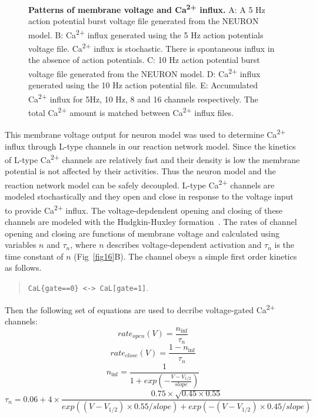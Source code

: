 \documentclass[10pt,letterpaper]{article}
\begin{document}
\begin{figure}[!h]
	\caption{{\bf Patterns of membrane voltage and Ca\textsuperscript{2+} influx. }
	A: A 5 Hz action potential burst voltage file generated from the NEURON model. 
	B: Ca\textsuperscript{2+} influx generated using the 5 Hz action potentials voltage file. Ca\textsuperscript{2+} influx is stochastic. There is spontaneous influx in the absence of action potentials. 
	C: 10 Hz action potential burst voltage file generated from the NEURON model. 
	D: Ca\textsuperscript{2+} influx generated using the 10 Hz action potential file. 
	E: Accumulated Ca\textsuperscript{2+} influx for 5Hz, 10 Hz, 8 and 16 channels respectively. The total Ca\textsuperscript{2+} amount is matched between Ca\textsuperscript{2+} influx files.
	}
\label{fig15}
\end{figure}

This membrane voltage output for neuron model was used to determine Ca\textsuperscript{2+} influx through L-type channels in our reaction network model. Since the kinetics of L-type Ca\textsuperscript{2+} channels are relatively fast and their density is low the membrane potential is not affected by their activities. Thus the neuron model and the reaction network model can be safely decoupled. L-type Ca\textsuperscript{2+} channels are modeled stochastically and they open and close in response to the voltage input to provide Ca\textsuperscript{2+} influx. The voltage-depdendent opening and closing of these channels are modeled with the Hudgkin-Huxley formation~\cite{Tuckwell:2012tt}. The rates of channel opening and closing are functions of membrane voltage and calculated using variables $n$ and $\tau_n$, where $n$ describes voltage-dependent activation and $\tau_n$ is the time constant of $n$ (Fig~\ref{fig16}B). The channel obeys a simple first order kinetics as follows.

\begin{quote}
 \verb|CaL{gate==0} <-> CaL[gate=1]|.
\end{quote}
Then the following set of equations are used to decribe voltage-gated Ca\textsuperscript{2+} channels:
\begin{equation}rate_{open}(V)=\frac{n_{\inf}}{\tau_n}\end{equation}
\begin{equation}rate_{close}(V)=\frac{1-n_{\inf}}{\tau_n}\end{equation}
\begin{equation}n_{\inf}=\frac{1}{1+exp(-\frac{V-V_{1/2}}{slope})}\end{equation}
\begin{equation}\tau_n=0.06+4\times\frac{0.75\times\sqrt{0.45\times0.55}}{exp((V-V_{1/2})\times0.55/slope)+exp(-(V-V_{1/2})\times0.45/slope)}\end{equation}
\end{document}
